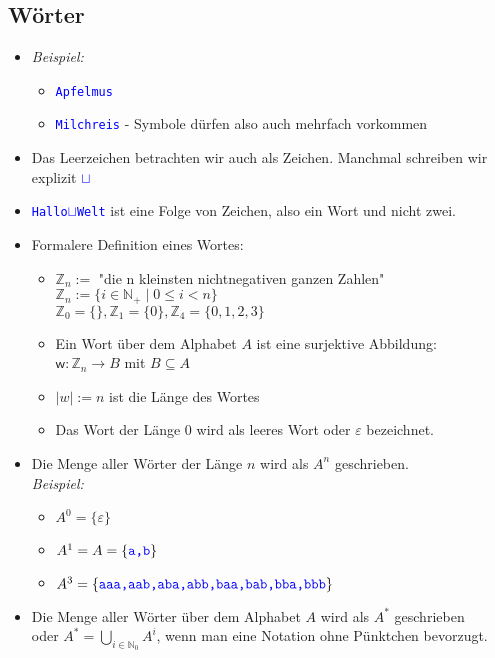 \documentclass{article}
\newcommand{\N}{\mathbb{N_+}} %
\newcommand{\Nz}{{\mathbb{N}_0}} %
\newcommand{\Z}{\mathbb{Z}} %
\newcommand{\leer}{$\varepsilon$}
\newcommand{\blue}[1]{\textcolor{blue}{#1}}
\newcommand{\important}[1]{\textcolor{importantColor}{#1}}
\newcommand{\example}[1]{\textit{Beispiel: }#1}
\newcommand{\word}[1]{\blue{\texttt{#1}}}
\newcommand{\set}[1]{\{#1\}}
\newcommand{\w}{\textsf{w}}
\newcommand{\wsp}{\word{\tiny $\sqcup$}}
\begin{document}
\subsection{Wörter}
\begin{itemize}
    \item \example
    \begin{itemize}
        \item \word{Apfelmus}
        \item \word{Milchreis} - Symbole dürfen also auch mehrfach vorkommen
    \end{itemize}
    \item Das Leerzeichen betrachten wir auch als Zeichen. Manchmal schreiben wir explizit \wsp
    \item \word{Hallo\wsp Welt} ist \important{eine} Folge von Zeichen, also \important{ein} Wort und nicht zwei.
    \item Formalere Definition eines Wortes:
    \begin{itemize}
        \item $\Z_n :=$ "die n kleinsten nichtnegativen ganzen Zahlen"\\
        $\Z_n := \set{i \in \N \mid 0\leq i < n}$\\
        $\Z_0 = \set{}, \Z_1 = \set{0}, \Z_4 = \set{0,1,2,3}$
        \item Ein Wort über dem Alphabet $A$ ist eine \important{surjektive Abbildung}:\\
        $\w: \Z_n \to B$  mit $B\subseteq A$ 
        \item \important{$|w| := n$} ist die Länge des Wortes
        \item Das Wort der Länge 0 wird als \important{leeres Wort} oder \important{\leer} bezeichnet.
    \end{itemize}
    \item Die Menge aller Wörter der Länge $n$ wird als \important{$A^n$} geschrieben.\\\example
    \begin{itemize}
        \item $A^0=\{$\leer$\}$
        \item $A^1 = A = \set{\word{a,b}}$
        \item $A^3 = \set{\word{aaa,aab,aba,abb,baa,bab,bba,bbb}}$
    \end{itemize}
    \item Die Menge aller Wörter über dem Alphabet $A$ wird als $A^*$ geschrieben\\
    oder $\displaystyle{A^* = \bigcup_{i\in \Nz}A^i}$, wenn man eine Notation ohne Pünktchen bevorzugt.

\end{itemize}
\end{document}
